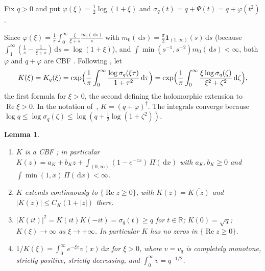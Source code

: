 \documentclass[11pt]{amsart}
\newcommand{\R}{\mathbb{R}}
\newcommand{\one}{\mathbf{1}}
\newcommand{\dd}{\,\mathrm{d}}
\DeclareMathOperator{\re}{Re}
\newtheorem{lemma}[theorem]{Lemma}
\theoremstyle{definition}
\theoremstyle{remark}
\numberwithin{equation}{section}
\begin{document}
Fix $q>0$ and put $\varphi(\xi)=\frac12\log(1+\xi)$ and $\sigma_q(t)=q+\Psi(t)=q+\varphi(t^2)$.

Since $\varphi(\xi)=\frac1\pi\int_0^\infty\frac{\xi}{\xi+s}\frac{m_0(\dd s)}{s}$ with $m_0(\dd s)=\frac\pi2\one_{(1,\infty)}(s)\dd s$ (because $\int_1^\infty(\frac1s-\frac1{\xi+s})\dd s=\log(1+\xi)$), and $\int\min(s^{-1},s^{-2})m_0(\dd s)<\infty$, both $\varphi$ and $q+\varphi$ are CBF \cite[Cor.~2.16(b)]{Kw11}. Following \cite[Def.~3.1, Prop.~3.2]{Kw11}, let
\begin{equation}\label{eq:K}
K(\xi)=K_q(\xi)=\exp\Bigl(\frac1\pi\int_0^\infty\frac{\log\sigma_q(\xi\tau)}{1+\tau^2}\dd\tau\Bigr)=\exp\Bigl(\frac1\pi\int_0^\infty\frac{\xi\log\sigma_q(\zeta)}{\xi^2+\zeta^2}\dd\zeta\Bigr),
\end{equation}
the first formula for $\xi>0$, the second defining the holomorphic extension to $\re\xi>0$. In the notation of~\cite{Kw11}, $K=(q+\varphi)^\dagger$. The integrals converge because $\log q\le\log\sigma_q(\zeta)\le\log(q+\frac12\log(1+\zeta^2))$.

\begin{lemma}\label{lem:K}
\begin{enumerate}
\item[(K1)] $K$ is a CBF \cite[Lemma~3.8]{Kw11}; in particular $K(z)=a_K+b_Kz+\int_{(0,\infty)}(1-e^{-zx})\,\Pi(\dd x)$ with $a_K,b_K\ge0$ and $\int\min(1,x)\,\Pi(\dd x)<\infty$.
\item[(K2)] $K$ extends continuously to $\{\re z\ge0\}$, with $K(\bar z)=\overline{K(z)}$ and $|K(z)|\le C_K(1+|z|)$ there.
\item[(K3)] $|K(it)|^2=K(it)K(-it)=\sigma_q(t)\ge q$ for $t\in\R$; $K(0)=\sqrt q$; $K(\xi)\to\infty$ as $\xi\to+\infty$. In particular $K$ has no zeros in $\{\re z\ge0\}$.
\item[(K4)] $1/K(\xi)=\int_0^\infty e^{-\xi x}v(x)\dd x$ for $\xi>0$, where $v=v_q$ is completely monotone, strictly positive, strictly decreasing, and $\int_0^\infty v=q^{-1/2}$.
\end{enumerate}
\end{lemma}
\end{document}
